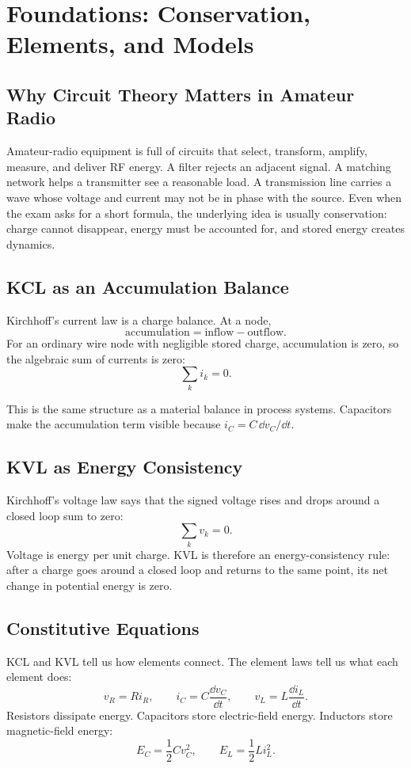 \chapter{Foundations: Conservation, Elements, and Models}
\label{ch:foundations}
\section{Why Circuit Theory Matters in Amateur Radio}
Amateur-radio equipment is full of circuits that select, transform, amplify,
measure, and deliver RF energy. A filter rejects an adjacent signal. A matching
network helps a transmitter see a reasonable load. A transmission line carries a
wave whose voltage and current may not be in phase with the source. Even when
the exam asks for a short formula, the underlying idea is usually conservation:
charge cannot disappear, energy must be accounted for, and stored energy creates
dynamics.

\section{KCL as an Accumulation Balance}
Kirchhoff's current law is a charge balance. At a node,
\[
\text{accumulation}=\text{inflow}-\text{outflow}.
\]
For an ordinary wire node with negligible stored charge, accumulation is zero,
so the algebraic sum of currents is zero:
\[
\sum_k i_k=0.
\]

\begin{controlsbox}
This is the same structure as a material balance in process systems. Capacitors
make the accumulation term visible because \(i_C=C\,\dd v_C/\dd t\).
\end{controlsbox}

\section{KVL as Energy Consistency}
Kirchhoff's voltage law says that the signed voltage rises and drops around a
closed loop sum to zero:
\[
\sum_k v_k=0.
\]
Voltage is energy per unit charge. KVL is therefore an energy-consistency rule:
after a charge goes around a closed loop and returns to the same point, its net
change in potential energy is zero.

\section{Constitutive Equations}
KCL and KVL tell us how elements connect. The element laws tell us what each
element does:
\[
v_R=Ri_R,\qquad i_C=C\frac{\dd v_C}{\dd t},\qquad
v_L=L\frac{\dd i_L}{\dd t}.
\]
Resistors dissipate energy. Capacitors store electric-field energy. Inductors
store magnetic-field energy:
\[
E_C=\frac{1}{2}Cv_C^2,\qquad
E_L=\frac{1}{2}Li_L^2.
\]

